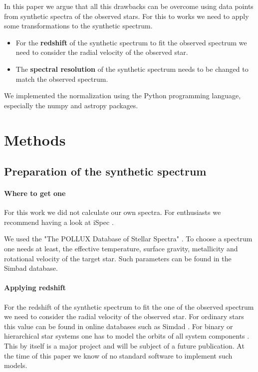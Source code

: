 \documentclass[10pt,a4paper,notitlepage,twocolumn]{article}
\begin{document}
In this paper we argue that all this drawbacks can be overcome using data points from synthetic spectra of the observed stars.
For this to works we need to apply some transformations to the synthetic spectrum.
\begin{itemize}
	\item For the {\bf redshift} of the synthetic spectrum to fit the observed spectrum we need to consider the radial velocity of the observed star.
	\item The {\bf spectral resolution} of the synthetic spectrum needs to be changed to match the observed spectrum.
\end{itemize}

We implemented the normalization using the Python programming language, especially the numpy \cite{numpy} and astropy \cite{astropy:2013} \cite{astropy:2018} packages.

\section{Methods}

\subsection{Preparation of the synthetic spectrum}

\paragraph{Where to get one}
For this work we did not calculate our own spectra.
For enthusiasts we recommend having a look at iSpec \cite{BlancoCuaresmaSoubiranHeiter2014}.

We used the "The POLLUX Database of Stellar Spectra" \cite{Pollux2010}.
To choose a spectrum one needs at least, the effective temperature, surface gravity, metallicity and rotational velocity of the target star.
Such parameters can be found in the Simbad \cite{Simbad} database.

\paragraph{Applying redshift}

For the redshift of the synthetic spectrum to fit the one of the observed spectrum we need to consider the radial velocity of the observed star.
For ordinary stars this value can be found in online databases such as Simdad \cite{Simbad}.
For binary or hierarchical star systems one has to model the orbits of all system components \cite{Gerlach2015}.
This by itself is a major project and will be subject of a future publication.
At the time of this paper we know of no standard software to implement such models.
\end{document}
